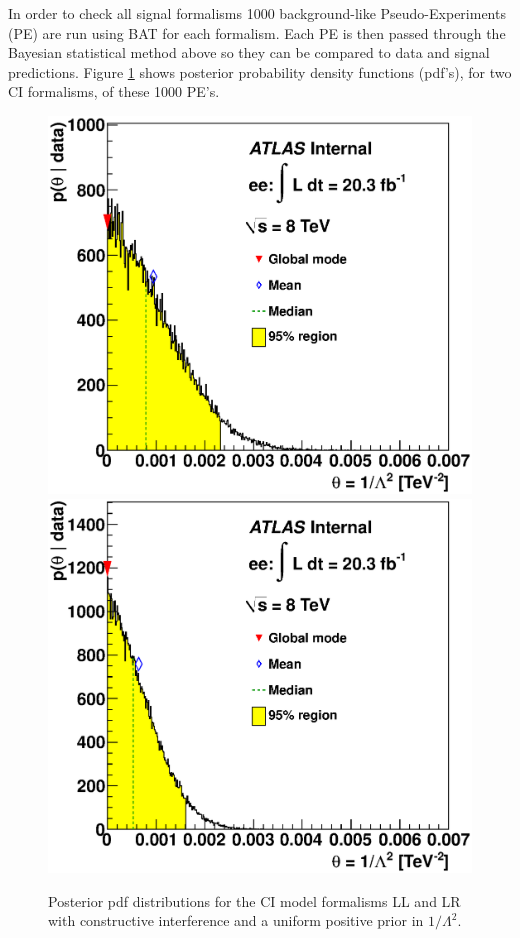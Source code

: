     In order to check all signal formalisms 1000 background-like Pseudo-Experiments (PE) are run using BAT for each formalism. Each PE is then passed through the Bayesian statistical method above so they can be compared to data and signal predictions. Figure \ref{fig:pdf_CI_main} shows posterior probability density functions (pdf's), for two CI formalisms, of these 1000 PE's.

    \begin{figure}[h]
        \begin{center}
            \includegraphics[width=0.49\linewidth]{images/post_LL_minus.eps}
            \includegraphics[width=0.49\linewidth]{images/post_LR_minus.eps}
        \end{center}
       \caption{Posterior pdf distributions for the CI model formalisms LL and LR with constructive interference and a uniform positive prior in $1/\Lambda^{2}$.}
       \label{fig:pdf_CI_main}
    \end{figure}





